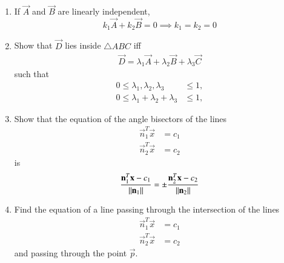 \begin{enumerate}[label=\arabic*.,ref=\thesubsection.\theenumi]
%
\item If $\vec{A}$ and $\vec{B}$ are linearly independent,  
\begin{equation}
k_1\vec{A} + k_2\vec{B} = 0 \implies k_1=k_2=0
\end{equation}
\item Show that $\vec{D}$ lies inside $\triangle ABC$ iff
\begin{align}
\vec{D} = \lambda_1\vec{A} + \lambda_2\vec{B} + \lambda_3\vec{C}
\end{align}
such that
\begin{align}
0 \le \lambda_1, \lambda_2, \lambda_3 &\le 1,
\\
0 \le \lambda_1+\lambda_2+\lambda_3 &\le 1,
\end{align}
\item Show that the equation of the angle bisectors of the lines
\begin{align}
\vec{n}_1^T\vec{x} &=c_1
\\
\vec{n}_2^T\vec{x} &=c_2
\end{align}
%
is
\begin{align}
\frac{\mathbf{n}_1^T\mathbf{x}-c_1}{\left\lVert\mathbf{n}_1\right\rVert}=\pm\frac{\mathbf{n}_2^T\mathbf{x} -c_2}{\left\lVert\mathbf{n}_2\right\rVert}\end{align}
\item Find the equation of a line passing through the intersection of the lines
\begin{align}
\label{eq:line1}
\vec{n}_1^T\vec{x} &=c_1
\\
\vec{n}_2^T\vec{x} &=c_2
\label{eq:line2}
\end{align}
and passing through the point $\vec{p}$.
\\
\solution 
%

\end{enumerate}

